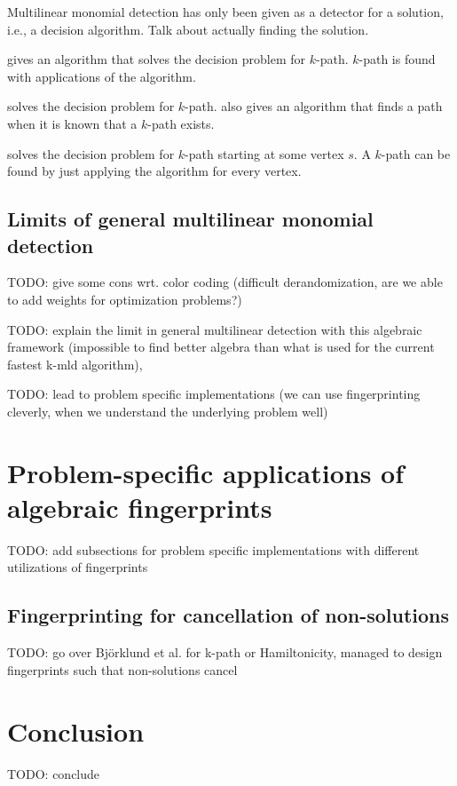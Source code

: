 Multilinear monomial detection has only been given as a detector for a solution, i.e., a decision algorithm. 
Talk about actually finding the solution.

\cite{Koutis08} gives an algorithm that solves the decision problem for $k$-path. 
$k$-path is found with  applications of the algorithm.

\cite{Williams09} solves the decision problem for $k$-path. \cite{Williams09} also gives an algorithm 
that finds a path when it is known that a $k$-path exists.

\cite{Björklund17} solves the decision problem for $k$-path starting at some vertex $s$. 
A $k$-path can be found by just applying the algorithm for every vertex.

\subsection{Limits of general multilinear monomial detection}

TODO: give some cons wrt. color coding (difficult derandomization, 
are we able to add weights for optimization problems?) %

TODO: explain the limit in general multilinear detection with this algebraic framework 
(impossible to find better algebra than what is used for the current fastest k-mld algorithm), \cite{KouWil09}

TODO: lead to problem specific implementations 
(we can use fingerprinting cleverly, when we understand the underlying problem well)

\section{Problem-specific applications of algebraic fingerprints}

TODO: add subsections for problem specific implementations with different utilizations of fingerprints

\subsection{Fingerprinting for cancellation of non-solutions}

TODO: go over Björklund et al. for k-path or Hamiltonicity, managed to design fingerprints such that non-solutions cancel

\section{Conclusion}

TODO: conclude